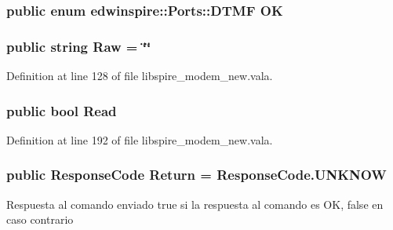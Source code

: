 \hypertarget{namespaceedwinspire_1_1_ports_a1c098ccc8f7a4f8bd868fa4887872b4e}{
\subsubsection[{O\-K}]{\setlength{\rightskip}{0pt plus 5cm}public enum {\bf edwinspire\-::\-Ports\-::\-D\-T\-M\-F}
			 O\-K}}\label{namespaceedwinspire_1_1_ports_a1c098ccc8f7a4f8bd868fa4887872b4e}
\hypertarget{namespaceedwinspire_1_1_ports_afeb780627bc31cc4b50e998eaf2fb6f0}{
\subsubsection[{Raw}]{\setlength{\rightskip}{0pt plus 5cm}public string Raw = \char`\"{}\char`\"{}}}\label{namespaceedwinspire_1_1_ports_afeb780627bc31cc4b50e998eaf2fb6f0}


Definition at line 128 of file libspire\-\_\-modem\-\_\-new.\-vala.

\hypertarget{namespaceedwinspire_1_1_ports_a4bfcb5e5e2846ac1676d0f53dff50445}{
\subsubsection[{Read}]{\setlength{\rightskip}{0pt plus 5cm}public bool Read}}\label{namespaceedwinspire_1_1_ports_a4bfcb5e5e2846ac1676d0f53dff50445}


Definition at line 192 of file libspire\-\_\-modem\-\_\-new.\-vala.

\hypertarget{namespaceedwinspire_1_1_ports_a8b086f30ecfbef96ca3e5f5642767975}{
\subsubsection[{Return}]{\setlength{\rightskip}{0pt plus 5cm}public Response\-Code Return = Response\-Code.\-U\-N\-K\-N\-O\-W}}\label{namespaceedwinspire_1_1_ports_a8b086f30ecfbef96ca3e5f5642767975}


Respuesta al comando enviado true si la respuesta al comando es O\-K, false en caso contrario 




